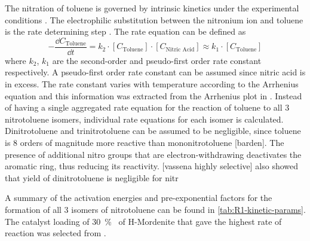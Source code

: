 
The nitration of toluene is governed by intrinsic kinetics under the experimental conditions \cite{jeeru_kinetics_2018}. The electrophilic substitution between the  nitronium ion and toluene is the rate determining step \cite{carey_advanced_2007}. The rate equation can be defined as  
\begin{equation}
-\frac{\dd C_\mathrm{Toluene}}{\dd t} = k_{2} \cdot [C_\mathrm{Toluene}] \cdot [C_\text{Nitric Acid}] \approx k_{1} \cdot [C_\mathrm{Toluene}]
\end{equation}
where $k_2$, $k_1$ are the second-order and pseudo-first order rate constant respectively. A pseudo-first order rate constant can be assumed since nitric acid is in excess. The rate constant varies with temperature according to the Arrhenius equation and this information was extracted from the Arrhenius plot in \textcite{jeeru_kinetics_2018}. Instead of having a single aggregated rate equation for the reaction of toluene to all 3 nitrotoluene isomers, individual rate equations for each isomer is calculated. Dinitrotoluene and trinitrotoluene can be assumed to be negligible, since toluene is 8 orders of magnitude more reactive than mononitrotoluene [barden]. The presence of additional nitro groups that are electron-withdrawing deactivates the aromatic ring, thus reducing its reactivity. [vassena highly selective] also showed that yield of dinitrotoluene is negligible for nitr

A summary of the activation energies and pre-exponential factors for the formation of all 3 isomers of nitrotoluene can be found in \cref{tab:R1-kinetic-params}. The catalyst loading of \SI{30}{\percent\wv} of H-Mordenite that gave the highest rate of reaction was selected from \textcite{jeeru_kinetics_2018}.
